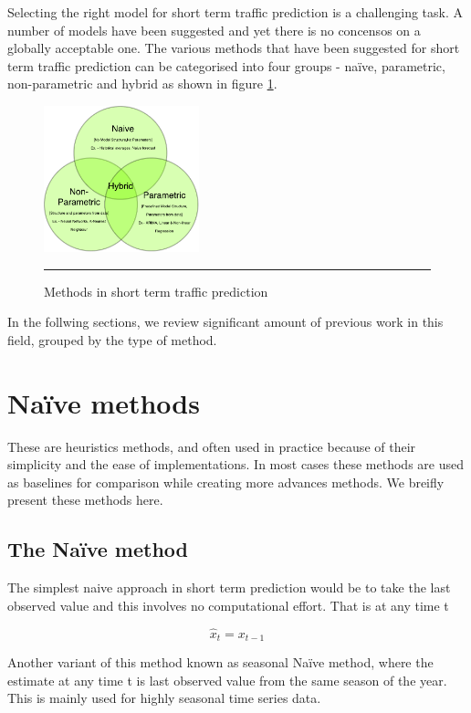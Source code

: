 Selecting the right model for short term traffic prediction is a challenging task. A number of
models have been suggested and yet there is no concensos on a globally acceptable one. The various
methods that have been suggested for short term traffic prediction can be categorised into four
groups - naïve, parametric, non-parametric and hybrid as shown in figure \ref{fig:sttp-methods}.

\begin{figure}[htbp]
  \centering
    \includegraphics[width=0.4\textwidth,height=0.4\textheight,keepaspectratio]{Figures/sttp-methods.pdf}
    \rule{35em}{0.5pt}
  \caption[Methods in short term traffic prediction]{Methods in short term traffic prediction}
  \label{fig:sttp-methods}
\end{figure}

In the follwing sections, we review significant amount of previous work in this field, grouped by the
type of method.

\section{Naïve methods}
These are heuristics methods, and often used in practice because of their simplicity and the ease
of implementations. In most cases these methods are used as baselines for comparison while
creating more advances methods. We breifly present these methods here.

\subsection{The Naïve method}
The simplest naive approach in short term prediction would be to take the last observed value and
this involves no computational effort. That is at any time t

        \begin{equation}
            \hat{x}_{t} = x_{t-1}
        \end{equation}

Another variant of this method known as seasonal Naïve method, where the estimate at any time t is
last observed value from the same season of the year. This is mainly used for highly seasonal time
series data.

